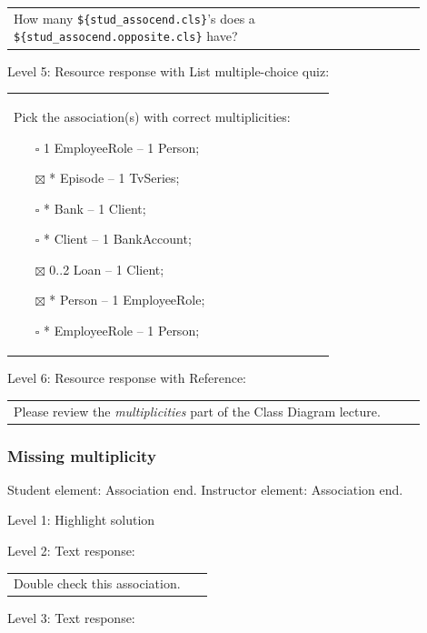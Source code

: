 \begin{tabular}{|p{0.9\linewidth}}
How many \verb|${stud_assocend.cls}|'s does a \verb|${stud_assocend.opposite.cls}| have?
\end{tabular} \medskip

\noindent Level 5: Resource response with List multiple-choice quiz: \medskip

\begin{tabular}{|p{0.9\linewidth}}

Pick the association(s) with correct multiplicities:

\begin{itemize}
    \item[$\square$] 1 EmployeeRole -- 1 Person;
    \item[$\boxtimes$] * Episode -- 1 TvSeries;
    \item[$\square$] * Bank -- 1 Client;
    \item[$\square$] * Client -- 1 BankAccount;
    \item[$\boxtimes$] 0..2 Loan -- 1 Client;
    \item[$\boxtimes$] * Person -- 1 EmployeeRole;
    \item[$\square$] * EmployeeRole -- 1 Person;
\end{itemize}

\end{tabular} \medskip

\noindent Level 6: Resource response with Reference: \medskip

\begin{tabular}{|p{0.9\linewidth}}
Please review the \textit{multiplicities} part of the Class Diagram lecture.
\end{tabular} \medskip


\subsubsection{Missing multiplicity}

Student element: Association end. Instructor element: Association end. \medskip

\noindent Level 1: Highlight solution  \medskip

\noindent Level 2: Text response: \medskip

\begin{tabular}{|p{0.9\linewidth}}
Double check this association.
\end{tabular} \medskip

\noindent Level 3: Text response: \medskip

